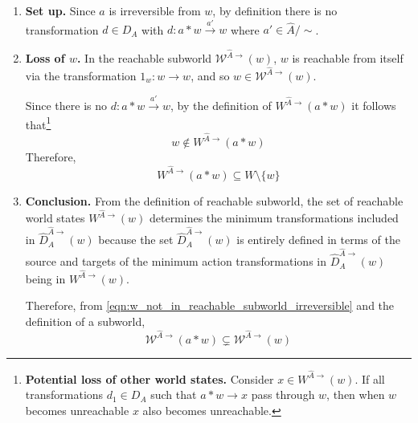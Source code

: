 \begin{proofE}
\begin{enumerate}[(1)]
    \item \textbf{Set up.}
    Since $a$ is irreversible from $w$, by definition there is no transformation $d \in D_{A}$ with $d: a \ast w \xrightarrow{a'} w$ where $a' \in \hat{A}/\sim$.

    \item \textbf{Loss of $w$.}
    In the reachable subworld $\mathscr{W}^{\hat{A}\to}(w)$, $w$ is reachable from itself via the transformation $1_{w}: w \to w$, and so $w \in \mathscr{W}^{\hat{A}\to}(w)$.
    
    Since there is no $d: a \ast w \xrightarrow{a'} w$, by the definition of $W^{\hat{A}\to}(a \ast w)$ it follows that\footnote{
    \textbf{Potential loss of other world states.}
    Consider $x \in W^{\hat{A}\to}(w)$.
    If all transformations $d_{1} \in D_{A}$ such that $a \ast w \to x$ pass through $w$, then when $w$ becomes unreachable $x$ also becomes unreachable.
    }
    \begin{equation}
        w \not\in W^{\hat{A}\to}(a \ast w)
        \label{eqn:w_not_in_reachable_subworld_irreversible}
    \end{equation}
    Therefore,
    \begin{equation}
        W^{\hat{A}\to}(a \ast w) \subseteq W \setminus \{w\}
    \end{equation}

    \item \textbf{Conclusion.}
    From the definition of reachable subworld, the set of reachable world states $W^{\hat{A}\to}(w)$ determines the minimum transformations included in $\hat{D}_{A}^{\hat{A}\to}(w)$ because the set $\hat{D}_{A}^{\hat{A}\to}(w)$ is entirely defined in terms of the source and targets of the minimum action transformations in $\hat{D}_{A}^{\hat{A}\to}(w)$ being in $W^{\hat{A}\to}(w)$.
    
    Therefore, from \cref{eqn:w_not_in_reachable_subworld_irreversible} and the definition of a subworld,
    \begin{equation}
        \mathscr{W}^{\hat{A}\to}(a \ast w) \subsetneq \mathscr{W}^{\hat{A}\to}(w)
    \end{equation}
\end{enumerate}
\end{proofE}



